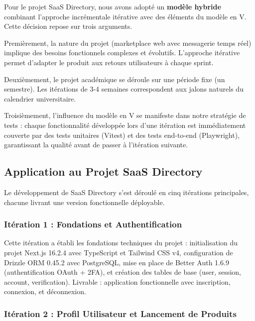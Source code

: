 Pour le projet SaaS Directory, nous avons adopté un \textbf{modèle hybride} combinant l'approche incrémentale itérative avec des éléments du modèle en V. Cette décision repose sur trois arguments.



Premièrement, la nature du projet (marketplace web avec messagerie temps réel) implique des besoins fonctionnels complexes et évolutifs. L'approche itérative permet d'adapter le produit aux retours utilisateurs à chaque sprint.



Deuxièmement, le projet académique se déroule sur une période fixe (un semestre). Les itérations de 3-4 semaines correspondent aux jalons naturels du calendrier universitaire.



Troisièmement, l'influence du modèle en V se manifeste dans notre stratégie de tests : chaque fonctionnalité développée lors d'une itération est immédiatement couverte par des tests unitaires (Vitest) et des tests end-to-end (Playwright), garantissant la qualité avant de passer à l'itération suivante.



\subsection{Application au Projet SaaS Directory}



Le développement de SaaS Directory s'est déroulé en cinq itérations principales, chacune livrant une version fonctionnelle déployable.



\subsubsection{Itération 1 : Fondations et Authentification}



Cette itération a établi les fondations techniques du projet : initialisation du projet Next.js 16.2.4 avec TypeScript et Tailwind CSS v4, configuration de Drizzle ORM 0.45.2 avec PostgreSQL, mise en place de Better Auth 1.6.9 (authentification OAuth + 2FA), et création des tables de base (user, session, account, verification). Livrable : application fonctionnelle avec inscription, connexion, et déconnexion.



\subsubsection{Itération 2 : Profil Utilisateur et Lancement de Produits}



